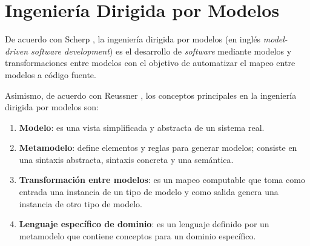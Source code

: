 \section{Ingeniería Dirigida por Modelos}

De acuerdo con Scherp \cite{scherp_framework_2013}, la ingeniería dirigida por modelos (en inglés \textit{model-driven software development}) es el desarrollo de \textit{software} mediante modelos y transformaciones entre modelos con el objetivo de automatizar el mapeo entre modelos a código fuente.

Asimismo, de acuerdo con Reussner \cite{reussner_handbuch_2006}, los conceptos principales en la ingeniería dirigida por modelos son:

\begin{enumerate}
  \item \textbf{Modelo}: es una vista simplificada y abstracta de un sistema real. 
  \item \textbf{Metamodelo}: define elementos y reglas para generar modelos; consiste en una sintaxis abstracta, sintaxis concreta y una semántica.
  \item \textbf{Transformación entre modelos}: es un mapeo computable que toma como entrada una instancia de un tipo de modelo y como salida genera una instancia de otro tipo de modelo.
  \item \textbf{Lenguaje específico de dominio}: es un lenguaje definido por un metamodelo que contiene conceptos para un dominio específico.
\end{enumerate}